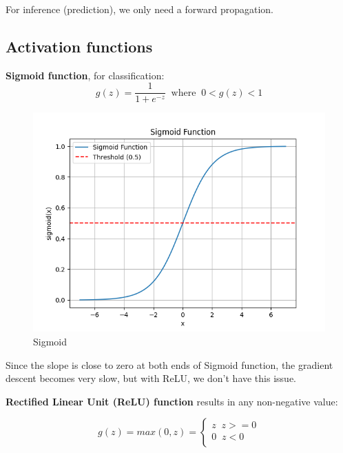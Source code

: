\documentclass[12pt]{report}
\begin{document}
For inference (prediction), we only need a forward propagation.

\subsection{Activation functions}
\label{sec:activation}

\textbf{Sigmoid function}, for classification:
\begin{equation}
  g(z) = \frac{1}{1+e^{-z}} \;\; \text{where} \;\; 0<g(z)<1
\end{equation}

\begin{figure}[H]
  \centering
  \includegraphics[trim =0.0cm 0.0cm 0.0cm 0.0cm, clip, scale=0.5]{pics/sigmoid.png}
  \caption{Sigmoid}
\end{figure}
Since the slope is close to zero at both ends of Sigmoid function, the gradient descent becomes very slow, but with ReLU, we don't have this issue.

\textbf{Rectified Linear Unit (ReLU) function} results in any non-negative value:

\begin{equation}
  g(z) = max (0,z) =
\begin{cases}
  z \;\; z >= 0  \\
  0 \;\; z < 0 \\
\end{cases}
\end{equation}
\end{document}
